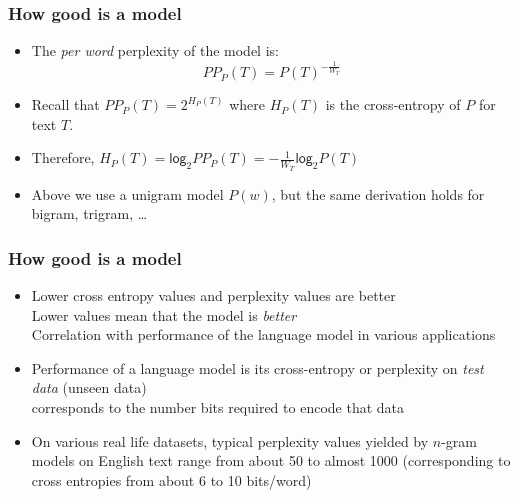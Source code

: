 \documentclass{beamer}
\begin{document}
\begin{frame}
\frametitle{How good is a model}
\begin{itemize}[<+->]
\item The {\em per word} perplexity of the model is:
\[ \textit{PP}_P(T) = P(T)^{- \frac{1}{W_T}} \]

\item Recall that $\textit{PP}_P(T) = 2^{H_P(T)}$ where $H_P(T)$ is the cross-entropy of $P$ for text $T$.

\item Therefore, $H_P(T) = \textsf{log}_2 \textit{PP}_P(T) = - \frac{1}{W_T} \textsf{log}_2 P(T)$

\item Above we use a unigram model $P(w)$, but the same derivation holds for bigram, trigram, \dots
\end{itemize}
\end{frame}

\begin{frame}
\frametitle{How good is a model}
\begin{itemize}[<+->]
\item Lower cross entropy values and perplexity values are better \\
Lower values mean that the model is {\em better} \\
Correlation with performance of the language model in various applications
\item Performance of a language model is its cross-entropy or perplexity on {\em test data} (unseen data) \\
corresponds to the number bits required to encode that data
\item On various real life datasets, typical perplexity values yielded by $n$-gram models on English text range from about 50 to almost 1000 (corresponding to cross entropies from about 6 to 10 bits/word)
\end{itemize}
\end{frame}
\end{document}
